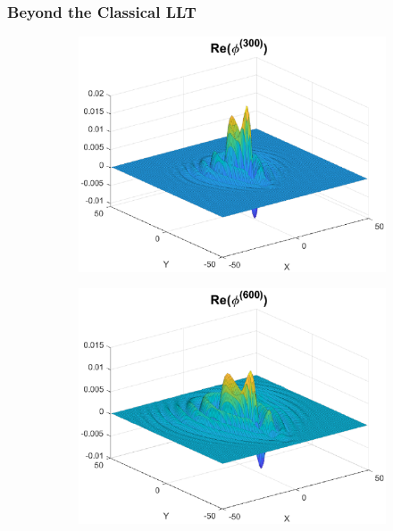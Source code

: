 \documentclass{beamer}
\theoremstyle{definition}
\begin{document}
\begin{frame}
\frametitle{Beyond the Classical LLT}

\begin{figure}
	\begin{subfigure}{0.495\textwidth}
		\centering
		\includegraphics[width=\textwidth]{conv_ex0.eps}
	\end{subfigure}
	\begin{subfigure}{0.495\textwidth}
		\centering
		\includegraphics[width=\textwidth]{conv_ex1.eps}
	\end{subfigure}
\end{figure}
\end{frame}
\end{document}
